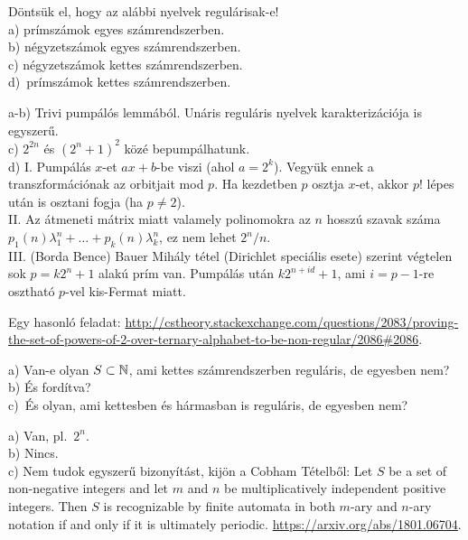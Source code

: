 	\begin{Exercise}[counter={sorszam}, difficulty=0]
		Döntsük el, hogy az alábbi nyelvek regulárisak-e!\\
		a) prímszámok egyes számrendszerben.\\
		b) négyzetszámok egyes számrendszerben.\\ 
		c) négyzetszámok kettes számrendszerben.\\
		d)~\hard prímszámok kettes számrendszerben.
	\end{Exercise}
	\begin{Answer}
		a-b) Trivi pump\'al\'os lemm\'ab\'ol. Un\'aris regul\'aris nyelvek karakteriz\'aci\'oja is egyszer\H u.\\
		c) $2^{2n}$ \'es $(2^n+1)^2$ k\"oz\'e bepump\'alhatunk.\\
		d) I. Pump\'al\'as $x$-et $ax+b$-be viszi (ahol $a=2^k$).
		Vegy\"uk ennek a transzform\'aci\'onak az orbitjait mod $p$.
		Ha kezdetben $p$ osztja $x$-et, akkor $p!$ l\'epes ut\'an is osztani fogja (ha $p\ne 2$).\\
		II. Az \'atmeneti m\'atrix miatt valamely polinomokra az $n$ hossz\'u szavak sz\'ama $p_1(n)\lambda_1^n+\ldots+p_k(n)\lambda_k^n$, ez nem lehet $2^n/n$.\\
		III. (Borda Bence) Bauer Mih\'aly t\'etel (Dirichlet speci\'alis esete) szerint v\'egtelen sok $p=k2^n+1$ alak\'u pr\'im van. Pump\'al\'as ut\'an $k2^{n+id}+1$, ami $i=p-1$-re oszthat\'o $p$-vel kis-Fermat miatt.
		
		Egy hasonl\'o feladat: \url{http://cstheory.stackexchange.com/questions/2083/proving-the-set-of-powers-of-2-over-ternary-alphabet-to-be-non-regular/2086#2086}.
	\end{Answer}
	
	
	\begin{Exercise}[counter={sorszam}, difficulty=0]
		a) Van-e olyan $S\subset \mathbb{N}$, ami kettes számrendszerben reguláris, de egyesben nem?\\
		b) És fordítva?\\
		c)~\veryhard És olyan, ami kettesben és hármasban is reguláris, de egyesben nem?
	\end{Exercise}	
	\begin{Answer}
		a) Van, pl.\ $2^n$.\\
		b) Nincs.\\
		c) Nem tudok egyszer\H u bizony\'it\'ast, kij\"on a Cobham T\'etelb\H ol: Let $S$ be a set of non-negative integers and let $m$ and $n$ be multiplicatively independent positive integers. Then $S$ is recognizable by finite automata in both $m$-ary and $n$-ary notation if and only if it is ultimately periodic.
		\url{https://arxiv.org/abs/1801.06704}.
	\end{Answer}
	
